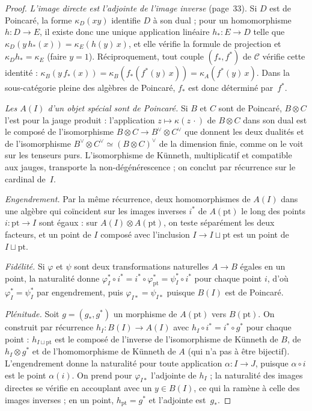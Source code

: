 \begin{proof}
\emph{L'image directe est l'adjointe de l'image inverse} (page~33). Si $D$ est de Poincaré, la forme $\kappa_D(xy)$ identifie $D$ à son dual ; pour un homomorphisme $h : D \to E$, il existe donc une unique application linéaire $h_* : E \to D$ telle que $\kappa_D(y\,h_*(x)) = \kappa_E(h(y)\,x)$, et elle vérifie la formule de projection et $\kappa_D h_* = \kappa_E$ (faire $y = 1$). Réciproquement, tout couple $(f_*, f^*)$ de $\mathcal{C}$ vérifie cette identité : $\kappa_B(y\,f_*(x)) = \kappa_B(f_*(f^*(y)\,x)) = \kappa_A(f^*(y)\,x)$. Dans la sous-catégorie pleine des algèbres de Poincaré, $f_*$ est donc déterminé par~$f^*$.

\emph{Les $A(I)$ d'un objet spécial sont de Poincaré.} Si $B$ et $C$ sont de Poincaré, $B \otimes C$ l'est pour la jauge produit : l'application $z \mapsto \kappa(z\,\cdot)$ de $B \otimes C$ dans son dual est le composé de l'isomorphisme $B \otimes C \to B^\vee \otimes C^\vee$ que donnent les deux dualités et de l'isomorphisme $B^\vee \otimes C^\vee \simeq (B \otimes C)^\vee$ de la dimension finie, comme on le voit sur les tenseurs purs. L'isomorphisme de Künneth, multiplicatif et compatible aux jauges, transporte la non-dégénérescence ; on conclut par récurrence sur le cardinal de~$I$.

\emph{Engendrement.} Par la même récurrence, deux homomorphismes de $A(I)$ dans une algèbre qui coïncident sur les images inverses $i^*$ de $A(\mathrm{pt})$ le long des points $i : \mathrm{pt} \to I$ sont égaux : sur $A(I) \otimes A(\mathrm{pt})$, on teste séparément les deux facteurs, et un point de $I$ composé avec l'inclusion $I \to I \sqcup \mathrm{pt}$ est un point de $I \sqcup \mathrm{pt}$.

\emph{Fidélité.} Si $\varphi$ et $\psi$ sont deux transformations naturelles $A \to B$ égales en un point, la naturalité donne $\varphi_I^* \circ i^* = i^* \circ \varphi_{\mathrm{pt}}^* = \psi_I^* \circ i^*$ pour chaque point $i$, d'où $\varphi_I^* = \psi_I^*$ par engendrement, puis $\varphi_{I*} = \psi_{I*}$ puisque $B(I)$ est de Poincaré.

\emph{Plénitude.} Soit $g = (g_*, g^*)$ un morphisme de $A(\mathrm{pt})$ vers $B(\mathrm{pt})$. On construit par récurrence $h_I : B(I) \to A(I)$ avec $h_I \circ i^* = i^* \circ g^*$ pour chaque point : $h_{I \sqcup \mathrm{pt}}$ est le composé de l'inverse de l'isomorphisme de Künneth de $B$, de $h_I \otimes g^*$ et de l'homomorphisme de Künneth de $A$ (qui n'a pas à être bijectif). L'engendrement donne la naturalité pour toute application $\alpha : I \to J$, puisque $\alpha \circ i$ est le point $\alpha(i)$. On prend pour $\varphi_{I*}$ l'adjointe de $h_I$ ; la naturalité des images directes se vérifie en accouplant avec un $y \in B(I)$, ce qui la ramène à celle des images inverses ; en un point, $h_{\mathrm{pt}} = g^*$ et l'adjointe est~$g_*$.


\end{proof}
